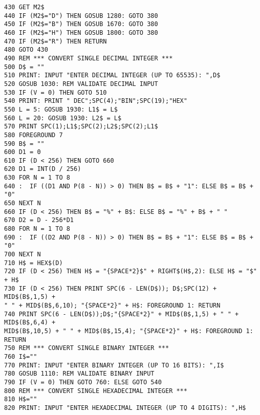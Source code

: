 \begin{tcolorbox}[colback=black,coltext=white]
\verbatimfont{\codefont}
\begin{verbatim}
430 GET M2$
440 IF (M2$="D") THEN GOSUB 1280: GOTO 380
450 IF (M2$="B") THEN GOSUB 1670: GOTO 380
460 IF (M2$="H") THEN GOSUB 1800: GOTO 380
470 IF (M2$="R") THEN RETURN
480 GOTO 430
490 REM *** CONVERT SINGLE DECIMAL INTEGER ***
500 D$ = ""
510 PRINT: INPUT "ENTER DECIMAL INTEGER (UP TO 65535): ",D$
520 GOSUB 1030: REM VALIDATE DECIMAL INPUT
530 IF (V = 0) THEN GOTO 510
540 PRINT: PRINT " DEC";SPC(4);"BIN";SPC(19);"HEX"
550 L = 5: GOSUB 1930: L1$ = L$
560 L = 20: GOSUB 1930: L2$ = L$
570 PRINT SPC(1);L1$;SPC(2);L2$;SPC(2);L1$
580 FOREGROUND 7
590 B$ = ""
600 D1 = 0
610 IF (D < 256) THEN GOTO 660
620 D1 = INT(D / 256)
630 FOR N = 1 TO 8
640 :  IF ((D1 AND P(8 - N)) > 0) THEN B$ = B$ + "1": ELSE B$ = B$ + "0"
650 NEXT N
660 IF (D < 256) THEN B$ = "%
670 D2 = D - 256*D1
680 FOR N = 1 TO 8
690 :  IF ((D2 AND P(8 - N)) > 0) THEN B$ = B$ + "1": ELSE B$ = B$ + "0"
700 NEXT N
710 H$ = HEX$(D)
720 IF (D < 256) THEN H$ = "{SPACE*2}$" + RIGHT$(H$,2): ELSE H$ = "$" + H$
730 IF (D < 256) THEN PRINT SPC(6 - LEN(D$)); D$;SPC(12) + MID$(B$,1,5) +
" " + MID$(B$,6,10); "{SPACE*2}" + H$: FOREGROUND 1: RETURN
740 PRINT SPC(6 - LEN(D$));D$;"{SPACE*2}" + MID$(B$,1,5) + " " + MID$(B$,6,4) +
MID$(B$,10,5) + " " + MID$(B$,15,4); "{SPACE*2}" + H$: FOREGROUND 1: RETURN
750 REM *** CONVERT SINGLE BINARY INTEGER ***
760 I$=""
770 PRINT: INPUT "ENTER BINARY INTEGER (UP TO 16 BITS): ",I$
780 GOSUB 1110: REM VALIDATE BINARY INPUT
790 IF (V = 0) THEN GOTO 760: ELSE GOTO 540
800 REM *** CONVERT SINGLE HEXADECIMAL INTEGER ***
810 H$=""
820 PRINT: INPUT "ENTER HEXADECIMAL INTEGER (UP TO 4 DIGITS): ",H$
\end{verbatim}
\end{tcolorbox}
